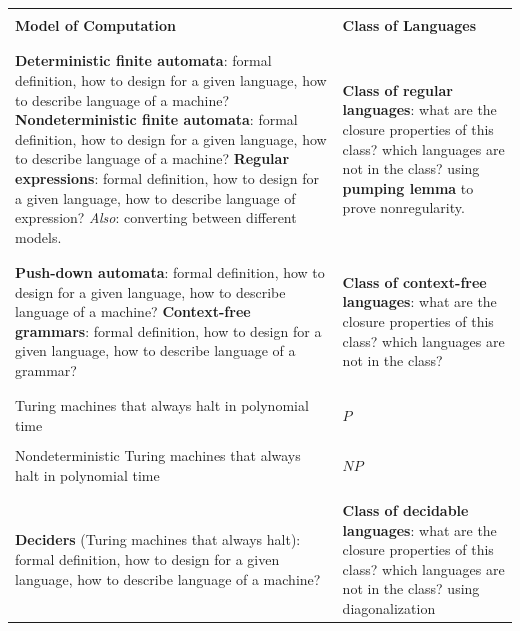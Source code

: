 \documentclass[12pt, oneside]{article}
\begin{document}
\begin{center}
    \begin{tabular}{|p{4in}|p{3.5in}|}
        \hline
        & \\
        {\bf Model of Computation} & {\bf Class of Languages}\\
        &\\
        \hline
        & \\
        {\bf Deterministic finite automata}:
        formal definition, how to design for a given language, 
        how to describe language of a machine?
        {\bf Nondeterministic finite automata}:
        formal definition, how to design for a given language, 
        how to describe language of a machine?
        {\bf Regular expressions}: formal definition, how to design for a given language, 
        how to describe language of expression?
        {\it Also}: converting between different models. &
        {\bf Class of regular languages}: what are the closure 
        properties of this class? which languages are not in the class?
        using {\bf pumping lemma} to prove nonregularity.\\
        & \\
        \hline
        & \\
        {\bf Push-down automata}:
        formal definition, how to design for a given language, 
        how to describe language of a machine?
        {\bf Context-free grammars}:
        formal definition, how to design for a given language, 
        how to describe language of a grammar? &
        {\bf Class of context-free languages}: what are the closure 
        properties of this class? which languages are not in the class?\\
        & \\
        \hline
        & \\
        Turing machines that always halt in polynomial time
        & $P$ \\
        & \\
        Nondeterministic Turing machines that always halt in polynomial time 
        & $NP$ \\
        & \\
        \hline
        & \\
        {\bf Deciders} (Turing machines that always halt): 
        formal definition, how to design for a given language, 
        how to describe language of a machine? &
        {\bf Class of decidable languages}: what are the closure properties 
        of this class? which languages are not in the class? using diagonalization

\end{tabular}
\end{center}
\end{document}
